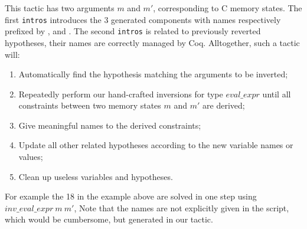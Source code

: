 \medskip
{}

\noindent
This tactic has two arguments $m$ and $m'$, corresponding to C memory states.
The first \texttt{intros} introduces the 3 generated components 
with names respectively prefixed by ,  and .
The second \texttt{intros} is related to previously reverted 
hypotheses, their names are correctly managed by Coq.
Alltogether, such a tactic will:
\begin{enumerate}
\item Automatically find the hypothesis matching the arguments to be inverted;
\item Repeatedly perform our hand-crafted inversions for type
  $eval\_expr$ until all constraints between two memory states $m$ and
  $m'$ are derived;
\item Give meaningful names to the derived constraints;
\item Update all other related hypotheses according to the new 
  variable names or values;
\item Clean up useless variables and hypotheses.
\end{enumerate}
%

\noindent
For example the 18 \inv in the example above are solved in 
one step using $inv\_eval\_expr~m~m'$, 
Note that the names are not explicitly given in the script,
which would be cumbersome,
but generated in our tactic.


